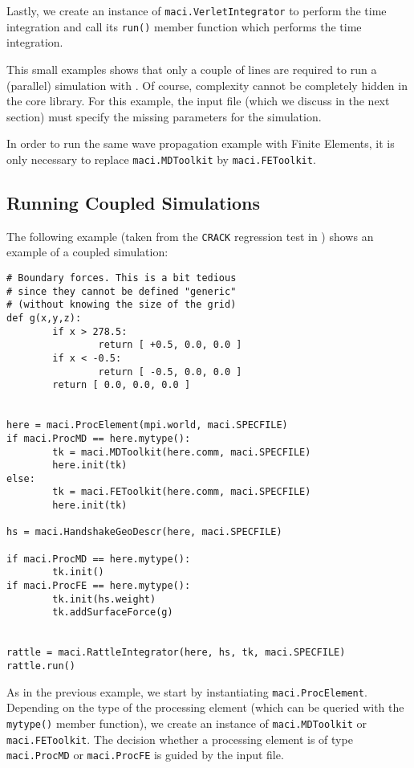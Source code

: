 Lastly, we create an instance of \lstinline[style=PYTHON]|maci.VerletIntegrator| to perform the time integration and call its \lstinline[style=PYTHON]|run()| member function which performs the time integration.\newline

This small examples shows that only a couple of lines are required to run a (parallel) simulation with \MACI. Of course, complexity cannot be completely hidden in the core library. For this example, the \XML input file (which we discuss in the next section) must specify the missing parameters for the simulation.\newline

In order to run the same wave propagation example with Finite Elements, it is only necessary to replace \lstinline[style=PYTHON]|maci.MDToolkit| by \lstinline[style=PYTHON]|maci.FEToolkit|.\newline

\subsection{Running Coupled Simulations}

The following example (taken from the \lstinline[style=SHELL]|CRACK| regression test in \MACI) shows an example of a coupled simulation:

\begin{lstlisting}[style=PYTHON_SMALL,frame=lines]
# Boundary forces. This is a bit tedious
# since they cannot be defined "generic"
# (without knowing the size of the grid)
def g(x,y,z):
        if x > 278.5:
                return [ +0.5, 0.0, 0.0 ]
        if x < -0.5:
                return [ -0.5, 0.0, 0.0 ]
        return [ 0.0, 0.0, 0.0 ]


here = maci.ProcElement(mpi.world, maci.SPECFILE)
if maci.ProcMD == here.mytype():
        tk = maci.MDToolkit(here.comm, maci.SPECFILE)
        here.init(tk)
else:
        tk = maci.FEToolkit(here.comm, maci.SPECFILE)
        here.init(tk)

hs = maci.HandshakeGeoDescr(here, maci.SPECFILE)

if maci.ProcMD == here.mytype():
        tk.init()
if maci.ProcFE == here.mytype():
        tk.init(hs.weight)
        tk.addSurfaceForce(g)


rattle = maci.RattleIntegrator(here, hs, tk, maci.SPECFILE)
rattle.run()
\end{lstlisting}

As in the previous example, we start by instantiating \lstinline[style=PYTHON]|maci.ProcElement|. Depending on the type of the processing element (which can be queried with the \lstinline[style=PYTHON]|mytype()| member function), we create an instance of \lstinline[style=PYTHON]|maci.MDToolkit| or \lstinline[style=PYTHON]|maci.FEToolkit|. The decision whether a processing element is of type \lstinline[style=PYTHON]|maci.ProcMD| or \lstinline[style=PYTHON]|maci.ProcFE| is guided by the \XML input file.\newline

